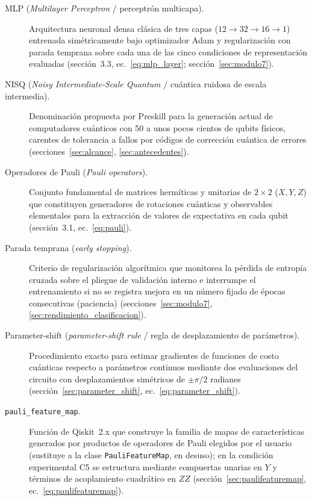 \begin{description}
  \item[MLP (\textit{Multilayer Perceptron} / perceptrón multicapa).] Arquitectura neuronal densa clásica de tres capas ($12 \to 32 \to 16 \to 1$) entrenada simétricamente bajo optimizador Adam y regularización con parada temprana sobre cada una de las cinco condiciones de representación evaluadas (sección~3.3, ec.~\ref{eq:mlp_layer}; sección~\ref{sec:modulo7}).

  \item[NISQ (\textit{Noisy Intermediate-Scale Quantum} / cuántica ruidosa de escala intermedia).] Denominación propuesta por Preskill para la generación actual de computadores cuánticos con 50 a unos pocos cientos de qubits físicos, carentes de tolerancia a fallos por códigos de corrección cuántica de errores (secciones~\ref{sec:alcance}, \ref{sec:antecedentes}).

  \item[Operadores de Pauli (\textit{Pauli operators}).] Conjunto fundamental de matrices hermíticas y unitarias de $2 \times 2$ ($X, Y, Z$) que constituyen generadores de rotaciones cuánticas y observables elementales para la extracción de valores de expectativa en cada qubit (sección~3.1, ec.~\ref{eq:pauli}).

  \item[Parada temprana (\textit{early stopping}).] Criterio de regularización algorítmica que monitorea la pérdida de entropía cruzada sobre el pliegue de validación interno e interrumpe el entrenamiento si no se registra mejora en un número fijado de épocas consecutivas (paciencia) (secciones~\ref{sec:modulo7}, \ref{sec:rendimiento_clasificacion}).

  \item[Parameter-shift (\textit{parameter-shift rule} / regla de desplazamiento de parámetros).] Procedimiento exacto para estimar gradientes de funciones de costo cuánticas respecto a parámetros continuos mediante dos evaluaciones del circuito con desplazamientos simétricos de $\pm \pi/2$ radianes (sección~\ref{sec:parameter_shift}, ec.~\ref{eq:parameter_shift}).

  \item[\texttt{pauli\_feature\_map}.] Función de Qiskit~2.x que construye la familia de mapas de características generados por productos de operadores de Pauli elegidos por el usuario (sustituye a la clase \texttt{PauliFeatureMap}, en desuso); en la condición experimental C5 se estructura mediante compuertas unarias en $Y$ y términos de acoplamiento cuadrático en $ZZ$ (sección~\ref{sec:paulifeaturemap}, ec.~\ref{eq:paulifeaturemap}).


\end{description}
